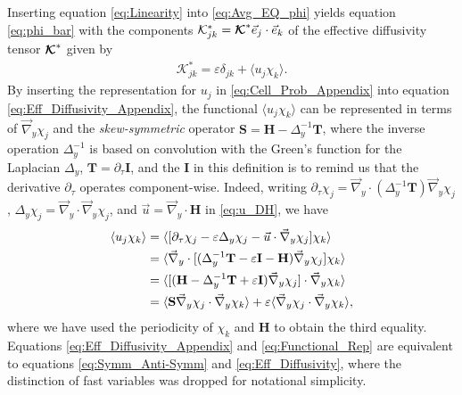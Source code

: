 \documentclass[11pt]{amsart}
\newcommand{\Tb}{\mathbf{T}}
\newcommand{\Hb}{\mathbf{H}}
\newcommand{\Ib}{\mathbf{I}}
\newcommand{\Sb}{\mathbf{S}}
\newcommand{\Kc}{\mathcal{K}}
\newcommand\Kbc{\mbox{\boldmath${\mathcal{K}}$}}
\begin{document}
Inserting equation \eqref{eq:Linearity} into \eqref{eq:Avg_EQ_phi}
yields equation \eqref{eq:phi_bar} with the components
$\Kc^*_{jk}=\Kbc^*\vec{e}_j\cdot\vec{e}_k$ of the effective diffusivity
tensor $\Kbc^*$ given by 
%
\begin{align}\label{eq:Eff_Diffusivity_Appendix}
  \Kc^*_{jk}=\varepsilon\delta_{jk}+\langle u_j\chi_k\rangle.
\end{align}
%
By inserting the representation for $u_j$ in
\eqref{eq:Cell_Prob_Appendix} into equation
\eqref{eq:Eff_Diffusivity_Appendix}, the functional $\langle u_j\chi_k\rangle$ can be
represented in terms of $\vec{\nabla}_y\chi_j$ and the \emph{skew-symmetric}
operator $\Sb=\Hb-\Delta_y^{-1}\Tb$, where the inverse operation $\Delta_y^{-1}$
is based on convolution with the Green's function for the Laplacian
$\Delta_y$, $\Tb=\partial_\tau\Ib$, and the $\Ib$ in this definition is to remind us
that the derivative $\partial_\tau$ operates component-wise. Indeed, writing  
$\partial_\tau\chi_j
=\vec{\nabla}_y\cdot(\Delta_y^{-1}\Tb)\vec{\nabla}_y\chi_j$,
$\Delta_y\chi_j=\vec{\nabla}_y\cdot\vec{\nabla}_y\chi_j$, and $\vec{u}=\vec{\nabla}_y\cdot\Hb$ in
\eqref{eq:u_DH}, we have    
%
\begin{align}\label{eq:Functional_Rep}
  \langle u_j\chi_k\rangle&=\langle[\partial_\tau\chi_j-\varepsilon\Delta_y\chi_j-\vec{u}\cdot\vec{\nabla}_y\chi_j]\chi_k\rangle
       \\
       &=\langle\vec{\nabla}_y\cdot[(\Delta_y^{-1}\Tb-\varepsilon\Ib-\Hb)\vec{\nabla}_y\chi_j]\chi_k\rangle
       \notag\\
       &=\langle[(\Hb-\Delta_y^{-1}\Tb+\varepsilon\Ib)\vec{\nabla}_y\chi_j]\cdot\vec{\nabla}_y\chi_k\rangle
       \notag\\
       &=\langle\Sb\vec{\nabla}_y\chi_j\cdot\vec{\nabla}_y\chi_k\rangle+\varepsilon\langle\vec{\nabla}_y\chi_j\cdot\vec{\nabla}_y\chi_k\rangle,
       \notag
\end{align}
%
where we have used the periodicity of $\chi_k$ and $\Hb$ to obtain the
third equality. Equations \eqref{eq:Eff_Diffusivity_Appendix} and
\eqref{eq:Functional_Rep} are equivalent to equations
\eqref{eq:Symm_Anti-Symm} and \eqref{eq:Eff_Diffusivity}, where the
distinction of fast variables was dropped for notational simplicity. 
\end{document}
